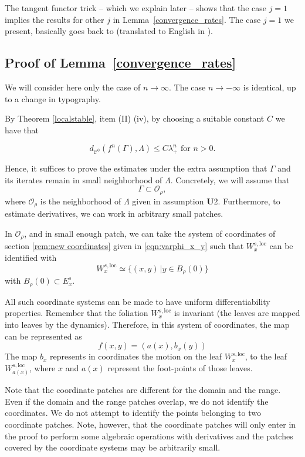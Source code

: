 \documentclass[11pt]{amsart}
\theoremstyle{definition}
\theoremstyle{remark}
\numberwithin{equation}{section}
\newcommand{\C}{\mathcal{C}}
\newcommand{\OO}{\mathcal{O}}
\begin{document}
The tangent functor trick \cite{AbrahamR67, HirschP70} -- which we explain later --
shows that the case $j = 1$ implies the results for other $j$ in
Lemma~\ref{convergence_rates}. The case $j=1$ we present,  basically goes back to
\cite{Hadamard98} (translated to English  in \cite{Hasselblatt17}).



\subsection{Proof of Lemma~\ref{convergence_rates} }

  We will consider here  only the case of $n \rightarrow \infty$.
  The case $n \rightarrow -\infty$  is identical, up to a change in typography.

By Theorem \ref{localstable}, item (II) (iv), by choosing a suitable constant  $C$ we have that

  \[
  d_{\C^0}(f^n(\Gamma), \Lambda) \le C\lambda_+^n \textrm{ for } n>0 .
  \]

Hence, it suffices to prove the estimates under the extra assumption
that $\Gamma$ and its iterates remain in small  neighborhood of $\Lambda$.
Concretely, we will assume that
\[
\Gamma \subset \OO_\rho,
\]
where $\OO_\rho$ is the neighborhood of $\Lambda$ given in assumption {\textbf U2}.
Furthermore, to estimate derivatives, we can work in   arbitrary small patches.


In $\OO_\rho$, and in small enough patch, we can take the system of coordinates of section  \ref{rem:new coordinates} given in  \eqref{eqn:varphi_x_y} such that $W^{s,\textrm{loc}}_x$
can be identified with
\[
W^{s, \textrm{loc}}_x\simeq  \{(x, y) \,| y \in B_\rho(0) \}
 \]
 with $B_\rho(0)\subset E^s_x$.


All such coordinate systems can be made to have uniform differentiability
properties.
Remember that the foliation  $W^{s,\textrm{loc}}_x$ is invariant (the leaves are mapped into leaves by the
dynamics).
Therefore, in this system of coordinates, the map can be represented as
\begin{equation}\label{map_coordinate}
  f(x,y) = ( a(x), b_x(y) )
\end{equation}
The map $b_x$ represents in coordinates the motion on the leaf $W^{s,\textrm{loc}}_x$,
to the leaf $W^{s, \textrm{loc}}_{a(x)}$, where $x$ and $a(x)$ represent the foot-points of those leaves.

Note that the coordinate patches are different for the domain and the range.
Even if the domain and the range patches overlap,  we do not identify the coordinates.
We do not attempt to identify the points belonging to two coordinate
patches. Note, however, that the coordinate patches will only enter in
the proof to perform some algebraic operations with derivatives
and the patches covered by the coordinate systems may be arbitrarily
small.
\end{document}
